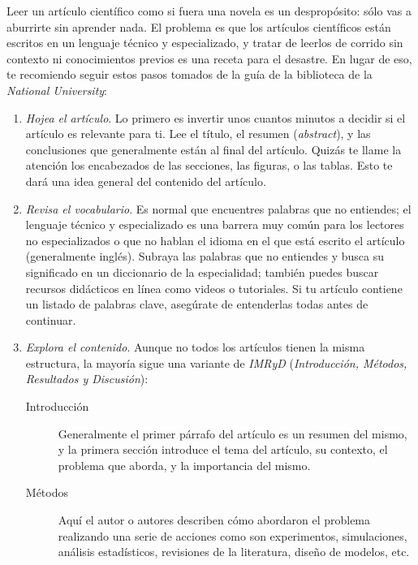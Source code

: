 Leer un artículo científico como si fuera una novela es un despropósito: sólo
vas a aburrirte sin aprender nada.
El problema es que los artículos científicos están escritos en un lenguaje
técnico y especializado, y tratar de leerlos de corrido sin contexto ni
conocimientos previos es una receta para el desastre.
En lugar de eso, te recomiendo seguir estos pasos tomados de la guía de la
biblioteca de la \emph{National University}\cite{NationalUniversity2024}:

\begin{enumerate}
  \item \emph{Hojea el artículo}. Lo primero es invertir unos cuantos minutos
        a decidir si el artículo es relevante para ti.
        Lee el título, el resumen (\emph{abstract}), y las conclusiones que
        generalmente están al final del artículo.
        Quizás te llame la atención los encabezados de las secciones, las
        figuras, o las tablas.
        Esto te dará una idea general del contenido del artículo.
  \item \emph{Revisa el vocabulario}. Es normal que encuentres palabras que no
        entiendes; el lenguaje técnico y especializado es una barrera muy común
        para los lectores no especializados o que no hablan el idioma en el que
        está escrito el artículo (generalmente inglés).
        Subraya las palabras que no entiendes y busca su significado en un
        diccionario de la especialidad; también puedes buscar recursos
        didácticos en línea como videos o tutoriales.
        Si tu artículo contiene un listado de palabras clave, asegúrate de
        entenderlas todas antes de continuar.
  \item \emph{Explora el contenido}. Aunque no todos los artículos tienen la
        misma estructura, la mayoría sigue una variante de \emph{IMRyD}
        (\emph{Introducción, Métodos, Resultados y Discusión}):
        \begin{description}
          \item[Introducción] Generalmente el primer párrafo del artículo es
                un resumen del mismo, y la primera sección introduce el tema
                del artículo, su contexto, el problema que aborda, y la
                importancia del mismo.
          \item[Métodos] Aquí el autor o autores describen cómo abordaron el
                problema realizando una serie de acciones como son
                experimentos, simulaciones, análisis estadísticos, revisiones
                de la literatura, diseño de modelos, etc.

\end{description}
\end{enumerate}

